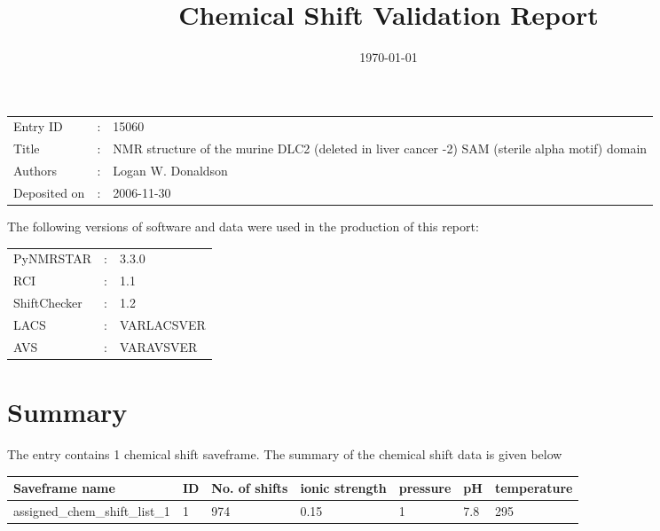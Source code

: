 \documentclass[12pt]{article}
\title{\LARGE Chemical Shift Validation Report} %
\author{}
\date{\today} %
\begin{document}
\maketitle 
\begin{center}
	\begin{tabular}{l c p{.8\linewidth}}
		Entry ID& : & 15060 \\
		Title& : & NMR structure of the murine DLC2 (deleted in liver cancer -2) SAM (sterile alpha motif) domain
 \\
		Authors& : & Logan W. Donaldson \\
		Deposited on& : & 2006-11-30 \\
	\end{tabular}
\end{center}
\vspace*{\fill}
The following versions of software and data  were used in the production of this report:
\begin{center}
	\begin{tabular}{l c l}
		PyNMRSTAR& : & 3.3.0 \\
		RCI& : & 1.1 \\
		ShiftChecker & : &1.2 \\
		LACS & : & VARLACSVER \\
		AVS & : & VARAVSVER\\
	\end{tabular}
\end{center}
\newpage

\section{Summary}
The entry contains 1 chemical shift saveframe. The summary of the chemical shift data is given below\\
\begin{center}
\begin{longtable}{|l|l|l|l|l|l|l|}
\hline
Saveframe name & ID & No. of shifts&ionic strength&pressure&pH&temperature\\
\hline
assigned\_chem\_shift\_list\_1 & 1 & 974&0.15&1&7.8&295\\
\hline
\end{longtable}

\end{center}
\end{document}
